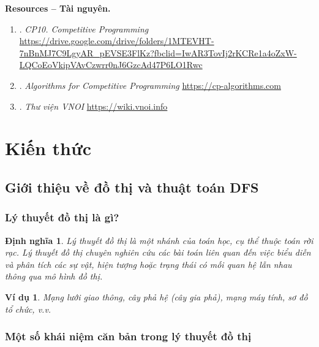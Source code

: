 \documentclass{article}
\newtheorem{dinhnghia}{Định nghĩa}
\newtheorem{vidu}{Ví dụ}
\begin{document}
\textbf{\textsf{Resources -- Tài nguyên.}}
\begin{enumerate}
	\item \cite{CP10}. \textit{CP10. Competitive Programming} \url{https://drive.google.com/drive/folders/1MTEVHT-7nBnMJ7C9LgyAR_pEVSE3FlKz?fbclid=IwAR3TovIj2rKCRe1a4oZxW-LQCoEoVkipVAvCzwrr0nJ6GzcAd47P6LO1Rwc}
	
	\item \cite{cp-algorithms}. \textit{Algorithms for Competitive Programming} \url{https://cp-algorithms.com}

    \item \cite{VNOI-WIKI}. \textit{Thư viện VNOI} \url{https://wiki.vnoi.info}



\end{enumerate}


\section{Kiến thức}
\subsection{Giới thiệu về đồ thị và thuật toán DFS}

\subsubsection{Lý thuyết đồ thị là gì?}

\begin{dinhnghia}
    Lý thuyết đồ thị là một nhánh của toán học, cụ thể thuộc toán rời rạc. Lý thuyết đồ thị chuyên nghiên cứu các bài toán liên quan đến việc biểu diễn và phân tích các sự vật, hiện tượng hoặc trạng thái có mối quan hệ lẫn nhau thông qua mô hình đồ thị.
\end{dinhnghia}
\begin{vidu}
    Mạng lưới giao thông, cây phả hệ (cây gia phả), mạng máy tính, sơ đồ tổ chức, v.v.
\end{vidu}

\subsubsection{Một số khái niệm căn bản trong lý thuyết đồ thị}
\end{document}
